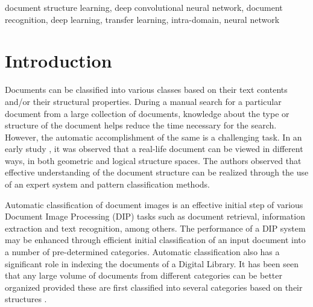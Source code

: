 \documentclass[10pt,conference,a4paper]{IEEEtran}
\begin{document}
\begin{IEEEkeywords}
document structure learning, deep convolutional neural network, document recognition, deep learning, transfer learning, intra-domain, neural network
\end{IEEEkeywords}


\section{Introduction}
Documents can be classified into various classes based on their text contents and/or their structural properties. During a manual search for a particular document from a large collection of documents, knowledge about the type or structure of the document helps reduce the time necessary for the search. However, the automatic accomplishment of the same is a challenging task. In an early study \cite{tang1991}, it was observed that a real-life document can be viewed in different ways, in both geometric and logical structure spaces. The authors observed that effective understanding of the document structure can be realized through the use of an expert system and pattern classification methods.


Automatic classification of document images is an effective initial step of various Document Image Processing (DIP) tasks such as document retrieval, information extraction and text recognition, among others. The performance of a DIP system may be enhanced through efficient initial classification of an input document into a number of pre-determined categories. Automatic classification also has a significant role in indexing the documents of a Digital Library. It has been seen that any large volume of documents from different categories can be better organized provided these are first classified into several categories based on their structures \cite{shin2001}.
\end{document}
